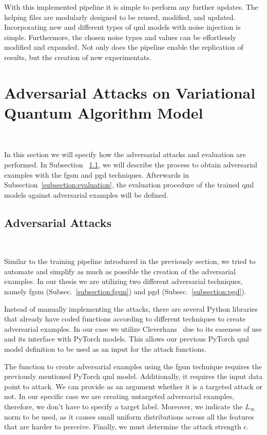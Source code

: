 With this implemented pipeline it is simple to perform
any further updates. The helping files are modularly
designed to be reused, modified, and updated. Incorporating
new and different types of \ac{qml} models with noise
injection is simple. Furthermore, the chosen noise types
and values can be effortlessly modified and expanded. 
Not only does the pipeline enable the replication of results,
but the creation of new experimentats. \

\section{Adversarial Attacks on Variational Quantum Algorithm Model}\label{section:vqa_attacks} \

In this section we will specify how the adversarial
attacks and evaluation are performed. In Subsection
~\ref{subsection:adv_attacks}, we will describe the process
to obtain adversarial examples with the \ac{fgsm} and \ac{pgd}
techniques. Afterwards in Subsection~\ref{subsection:evaluation},
the evaluation procedure of the trained \ac{qml} models against
adversarial examples will be defined. \

\subsection{Adversarial Attacks}\label{subsection:adv_attacks}\

Similar to the training pipeline introduced in the previously
section, we tried to automate and simplify as much as possible
the creation of the adversarial examples. In our thesis we
are utilizing two different adversarial techniques, namely
\ac{fgsm} (Subsec.~\ref{subsection:fgsm}) and \ac{pgd}
(Subsec.~\ref{subsection:pgd}). \

Instead of manually implementing the attacks, there are
several Python libraries that already have coded functions according
to different techniques to create adversarial examples. In our
case we utilize Cleverhans~\cite{papernot_technical_2018} due
to its easeness of use and its interface with PyTorch models.
This allows our previous PyTorch \ac{qml} model definition to
be used as an input for the attack functions. \

The function to create adversarial examples using the
\ac{fgsm} technique requires the previously mentioned
PyTorch \ac{qml} model. Additionally, it requires the
input data point to attack. We can provide as an argument
whether it is a targeted attack or not. In our specific
case we are creating untargeted adversarial examples,
therefore, we don't have to specify a target label.
Moreover, we indicate the \(L_{\infty}\) norm to be used,
as it causes small uniform distributions across all
the features that are harder to perceive. Finally,
we must determine the attack strength \(\epsilon\). \

